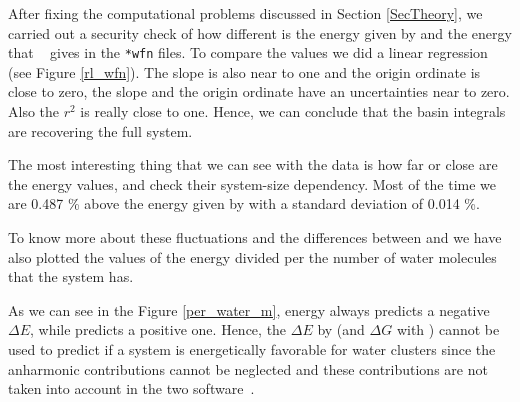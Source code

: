 After fixing the computational problems discussed in Section
\ref{SecTheory}, we carried out a security check of how different is the
energy given by {} and the energy that {}~\cite{g16}
gives in the \texttt{*wfn} files.  To compare the values we did a linear
regression (see Figure \ref{rl_wfn}).  The slope is  also near to one and the
origin ordinate is close to zero, the slope and the origin ordinate have an
uncertainties near to zero. Also the $r^2$ is really close to one. Hence, we
can conclude that the basin integrals are recovering the full system.

The most interesting thing that we can see with the data is how
far or close are the energy {} values,
and check their system-size dependency.
Most of the time we are 0.487 \% above the energy
given by {} with a standard deviation of 0.014
\%.

To know more about these fluctuations and the differences between {}
and {} we have also plotted the values of the energy divided per the number
of water molecules that the system has.

As we can see in the Figure \ref{per_water_m}, {} energy always
predicts a negative $\Delta E$, while {} predicts a positive one. Hence,
the $\Delta E$ by {} (and $\Delta G$ with {}) cannot be
used to predict if a system is energetically favorable for water clusters since the
anharmonic contributions cannot be neglected and these contributions are not
taken into account in the two software~\cite{MuozCaro1997}.

